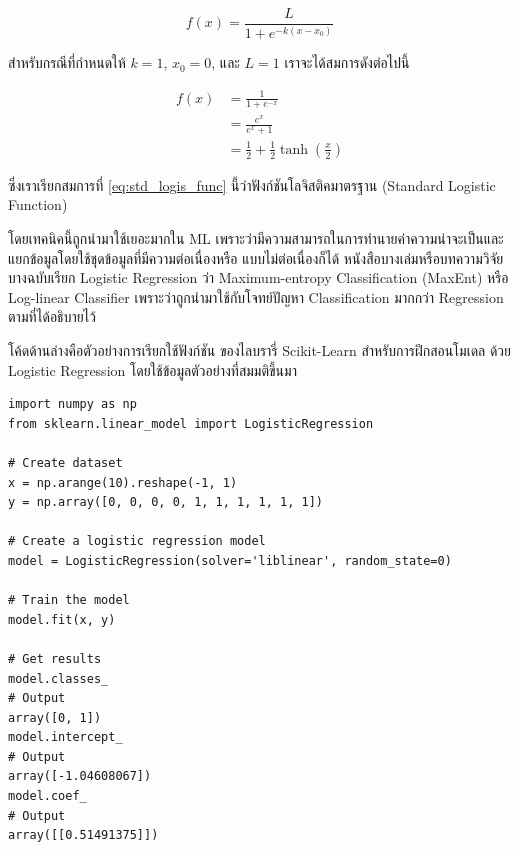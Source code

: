 \begin{equation}\label{eq:logistic_func}
    f(x) = \frac{L}{1 + e^{-k(x-x_0)}}
\end{equation}

\noindent สำหรับกรณีที่กำหนดให้ $k = 1$, $x_{0} = 0$, และ $L = 1$ เราจะได้สมการดังต่อไปนี้

\begin{align}\label{eq:std_logis_func}
    f(x) & = \frac{1}{1 + e^{-x}} \nonumber                  \\
         & = \frac{e^x}{e^x + 1} \nonumber                   \\
         & = \frac12 + \frac12 \tanh\left(\frac{x}{2}\right)
\end{align}

\noindent ซึ่งเราเรียกสมการที่ \eqref{eq:std_logis_func} นี้ว่าฟังก์ชันโลจิสติคมาตรฐาน (Standard Logistic Function)

โดยเทคนิคนี้ถูกนำมาใช้เยอะมากใน ML เพราะว่ามีความสามารถในการทำนายค่าความน่าจะเป็นและแยกข้อมูลโดยใช้ชุดข้อมูลที่มีความต่อเนื่องหรือ%
แบบไม่ต่อเนื่องก็ได้ หนังสือบางเล่มหรือบทความวิจัยบางฉบับเรียก Logistic Regression ว่า Maximum-entropy Classification (MaxEnt)
หรือ Log-linear Classifier เพราะว่าถูกนำมาใช้กับโจทย์ปัญหา Classification มากกว่า Regression ตามที่ได้อธิบายไว้

โค้ดด้านล่างคือตัวอย่างการเรียกใช้ฟังก์ชัน  ของไลบรารี่ Scikit-Learn สำหรับการฝึกสอนโมเดล%
ด้วย Logistic Regression โดยใช้ข้อมูลตัวอย่างที่สมมติขึ้นมา

\begin{lstlisting}[style=MyPython]
import numpy as np
from sklearn.linear_model import LogisticRegression

# Create dataset
x = np.arange(10).reshape(-1, 1)
y = np.array([0, 0, 0, 0, 1, 1, 1, 1, 1, 1])

# Create a logistic regression model
model = LogisticRegression(solver='liblinear', random_state=0)

# Train the model
model.fit(x, y)

# Get results
model.classes_
# Output
array([0, 1])
model.intercept_
# Output
array([-1.04608067])
model.coef_
# Output
array([[0.51491375]])
\end{lstlisting}

\vspace{1em}

